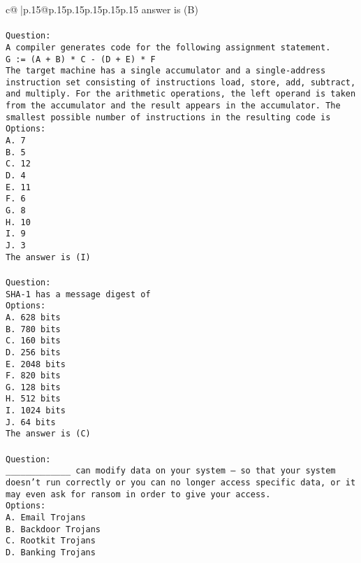 \documentclass{article}
\begin{document}
{\begin{supertabular}{c@{$\;$}|p{.15\linewidth}@{}p{.15\linewidth}p{.15\linewidth}p{.15\linewidth}p{.15\linewidth}p{.15\linewidth}}
{{{answer is (B)\\ \tt \\ \tt Question:\\ \tt A compiler generates code for the following assignment statement.\\ \tt G := (A + B) * C - (D + E) * F\\ \tt The target machine has a single accumulator and a single-address instruction set consisting of instructions load, store, add, subtract, and multiply. For the arithmetic operations, the left operand is taken from the accumulator and the result appears in the accumulator. The smallest possible number of instructions in the resulting code is\\ \tt Options:\\ \tt A. 7\\ \tt B. 5\\ \tt C. 12\\ \tt D. 4\\ \tt E. 11\\ \tt F. 6\\ \tt G. 8\\ \tt H. 10\\ \tt I. 9\\ \tt J. 3\\ \tt The answer is (I)\\ \tt \\ \tt Question:\\ \tt SHA-1 has a message digest of\\ \tt Options:\\ \tt A. 628 bits\\ \tt B. 780 bits\\ \tt C. 160 bits\\ \tt D. 256 bits\\ \tt E. 2048 bits\\ \tt F. 820 bits\\ \tt G. 128 bits\\ \tt H. 512 bits\\ \tt I. 1024 bits\\ \tt J. 64 bits\\ \tt The answer is (C)\\ \tt \\ \tt Question:\\ \tt _____________ can modify data on your system – so that your system doesn’t run correctly or you can no longer access specific data, or it may even ask for ransom in order to give your access.\\ \tt Options:\\ \tt A. Email Trojans\\ \tt B. Backdoor Trojans\\ \tt C. Rootkit Trojans\\ \tt D. Banking Trojans\\ }}}
\end{supertabular}}
\end{document}
